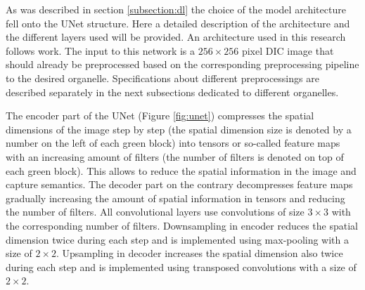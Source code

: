 As was described in section \ref{subsection:dl} the choice of the model architecture fell onto the UNet structure. Here a detailed description of the architecture and the different layers used will be provided. An architecture used in this research follows \cite{Lachance_2020} work. The input to this network is a $256 \times 256$ pixel DIC image that should already be preprocessed based on the corresponding preprocessing pipeline to the desired organelle. Specifications about different preprocessings are described separately in the next subsections dedicated to different organelles.

The encoder part of the UNet (Figure \ref{fig:unet}) compresses the spatial dimensions of the image step by step (the spatial dimension size is denoted by a number on the left of each green block) into tensors or so-called feature maps with an increasing amount of filters (the number of filters is denoted on top of each green block). This allows to reduce the spatial information in the image and capture semantics. The decoder part on the contrary decompresses feature maps gradually increasing the amount of spatial information in tensors and reducing the number of filters. All convolutional layers use convolutions of size $3 \times 3$ with the corresponding number of filters. Downsampling in encoder reduces the spatial dimension twice during each step and is implemented using max-pooling with a size of $2 \times 2$. Upsampling in decoder increases the spatial dimension also twice during each step and is implemented using transposed convolutions with a size of $2 \times 2$. 

